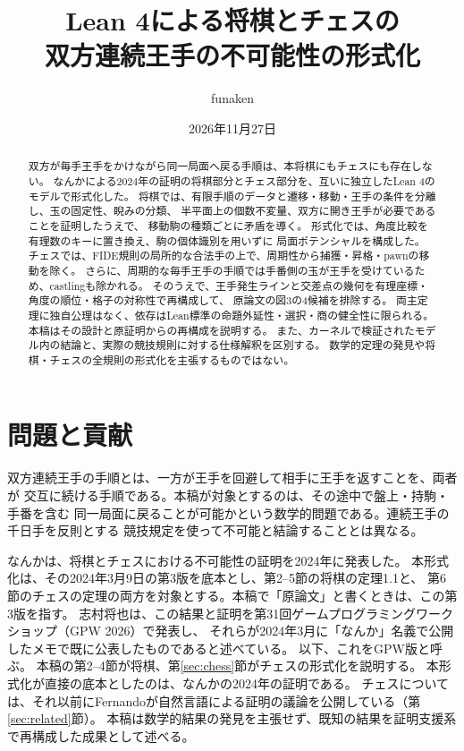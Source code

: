 \documentclass[a4paper,11pt]{article}
\title{Lean 4による将棋とチェスの\\双方連続王手の不可能性の形式化}
\author{funaken}
\date{2026年11月27日}
\theoremstyle{definition}
\begin{document}
\maketitle
\begin{abstract}
双方が毎手王手をかけながら同一局面へ戻る手順は、本将棋にもチェスにも存在しない。
なんかによる2024年の証明の将棋部分とチェス部分を、互いに独立したLean 4のモデルで形式化した。
将棋では、有限手順のデータと遷移・移動・王手の条件を分離し、玉の固定性、睨みの分類、
半平面上の個数不変量、双方に開き王手が必要であることを証明したうえで、
移動駒の種類ごとに矛盾を導く。
形式化では、角度比較を有理数のキーに置き換え、駒の個体識別を用いずに
局面ポテンシャルを構成した。
チェスでは、FIDE規則の局所的な合法手の上で、周期性から捕獲・昇格・pawnの移動を除く。
さらに、周期的な毎手王手の手順では手番側の玉が王手を受けているため、castlingも除かれる。
そのうえで、王手発生ラインと交差点の幾何を有理座標・角度の順位・格子の対称性で再構成して、
原論文の図3の4候補を排除する。
両主定理に独自公理はなく、依存はLean標準の命題外延性・選択・商の健全性に限られる。
本稿はその設計と原証明からの再構成を説明する。
また、カーネルで検証されたモデル内の結論と、実際の競技規則に対する仕様解釈を区別する。
数学的定理の発見や将棋・チェスの全規則の形式化を主張するものではない。
\end{abstract}

\section{問題と貢献}
双方連続王手の手順とは、一方が王手を回避して相手に王手を返すことを、両者が
交互に続ける手順である。本稿が対象とするのは、その途中で盤上・持駒・手番を含む
同一局面に戻ることが可能かという数学的問題である。連続王手の千日手を反則とする
競技規定を使って不可能と結論することとは異なる。

なんかは、将棋とチェスにおける不可能性の証明を2024年に発表した\cite{nanka}。
本形式化は、その2024年3月9日の第3版を底本とし、第2--5節の将棋の定理1.1と、
第6節のチェスの定理の両方を対象とする。本稿で「原論文」と書くときは、この第3版を指す。
志村将也は、この結果と証明を第31回ゲームプログラミングワークショップ（GPW 2026）で発表し、
それらが2024年3月に「なんか」名義で公開したメモで既に公表したものであると述べている\cite{gpw}。
以下、これをGPW版と呼ぶ。
本稿の第2--4節が将棋、第\ref{sec:chess}節がチェスの形式化を説明する。
本形式化が直接の底本としたのは、なんかの2024年の証明である。
チェスについては、それ以前にFernandoが自然言語による証明の議論を公開している\cite{fernando}（第\ref{sec:related}節）。
本稿は数学的結果の発見を主張せず、既知の結果を証明支援系で再構成した成果として述べる。
\end{document}
